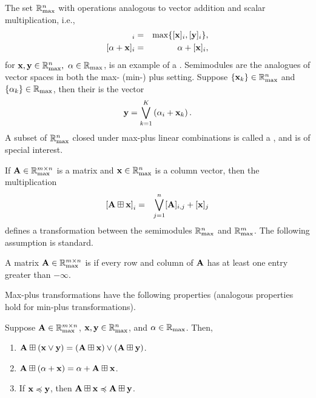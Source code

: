 \documentclass[letterpaper, 10 pt, conference]{ieeeconf}
\begin{document}
The set $\mathbb{R}_{\mathrm{max}}^n$ with operations analogous to vector addition and scalar multiplication, i.e.,
\begin{align*}
    [\x \join \y]_i &=& \max \{ [\x]_i, [\y]_i \}, \\
    [\alpha + \x]_i &=& \alpha +[\x]_i,
\end{align*}
for $\mathbf{x}, \mathbf{y} \in \mathbb{R}_{\mathrm{max}}^n,~\alpha \in \mathbb{R}_{\mathrm{max}}$, is an example of a .
Semimodules are the analogues of vector spaces in both the max- (min-) plus setting. Suppose $\{\mathbf{x}_k\} \in \mathbb{R}_{\mathrm{max}}^n$ and $\{\alpha_k\} \in \mathbb{R}_{\mathrm{max}}$, then their  is the vector
\begin{align*}
    \mathbf{y} = \bigvee_{k=1}^{K} \left(\alpha_i + \mathbf{x}_{k}\right).
\end{align*}
A subset of $\mathbb{R}_{\mathrm{max}}^n$ closed under max-plus linear combinations is called a , and is of special interest. 

If $\mathbf{A} \in \mathbb{R}_{\mathrm{max}}^{m \times n}$ is a matrix and $\mathbf{x} \in \mathbb{R}_{\mathrm{max}}^n$ is a column vector, then the multiplication
\begin{align*}
    \left[ \mathbf{A} \boxplus \mathbf{x} \right]_i &=& \bigvee_{j=1}^{n} [\mathbf{A}]_{i,j} + [\mathbf{x}]_j
\end{align*}
defines a transformation between the semimodules $\mathbb{R}_{\mathrm{max}}^n$ and $\mathbb{R}_{\mathrm{max}}^m$. The following assumption is standard.

\begin{definition}
    A matrix $\mathbf{A} \in \mathbb{R}_{\mathrm{max}}^{m \times n}$ is  if every row and column of $\mathbf{A}$ has at least one entry greater than $-\infty$.
\end{definition}

Max-plus transformations have the following properties (analogous properties hold for min-plus transformations).
\begin{lemma} \label{lem:nonlinear}
Suppose $\mathbf{A} \in \mathbb{R}_{\mathrm{max}}^{m\times n}$, $\mathbf{x}, \mathbf{y} \in \mathbb{R}_{\mathrm{max}}^n$, and $\alpha \in \mathbb{R}_{\mathrm{max}}$. Then,
\leavevmode
\begin{enumerate}
    \item $\mathbf{A} \boxplus \left( \mathbf{x} \vee \mathbf{y} \right) = \left(\mathbf{A} \boxplus \mathbf{x} \right) \vee \left( \mathbf{A} \boxplus \mathbf{y}\right)$.
    \item $\mathbf{A} \boxplus \left(\alpha + \mathbf{x} \right) = \alpha + \mathbf{A} \boxplus \mathbf{x}$.
    \item If $\mathbf{x} \preccurlyeq \mathbf{y}$, then $\mathbf{A} \boxplus \mathbf{x} \preccurlyeq \mathbf{A} \boxplus \mathbf{y}$.
\end{enumerate}
\end{lemma}
\end{document}
